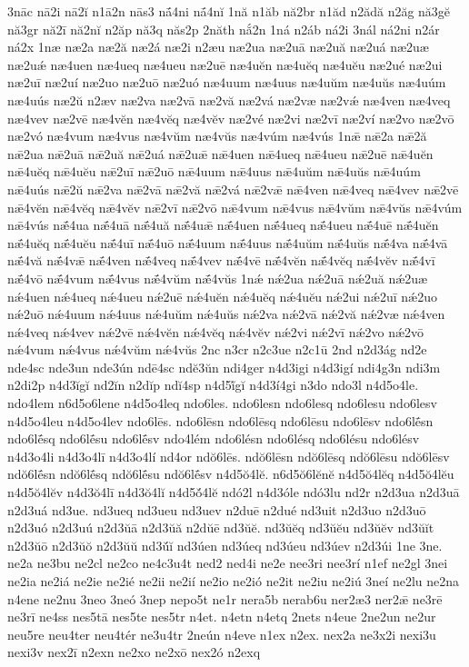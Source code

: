 {3nāc
nā2i
nā2ĭ
n1ā2n
nās3
nā́4ni
nā́4nĭ
1nă
n1ăb
nă2br
n1ăd
n2ădă
n2ăg
nă3gĕ
nă3gr
nă2ī
nă2nĭ
n2ăp
nă3q
năs2p
2năth
nắ2n
1ná
n2áb
ná2i
3nál
ná2ni
n2ár
ná2x
1næ
næ2a
næ2ă
næ2á
næ2i
n2æu
næ2ua
næ2uā
næ2uă
næ2uá
næ2uæ
næ2uǽ
næ4uen
næ4ueq
næ4ueu
næ2uē
næ4uĕn
næ4uĕq
næ4uĕu
næ2ué
næ2ui
næ2uī
næ2uí
næ2uo
næ2uō
næ2uó
næ4uum
næ4uus
næ4uŭm
næ4uŭs
næ4uúm
næ4uús
næ2ŭ
n2æv
næ2va
næ2vā
næ2vă
næ2vá
næ2væ
næ2vǽ
næ4ven
næ4veq
næ4vev
næ2vē
næ4vĕn
næ4vĕq
næ4vĕv
næ2vé
næ2vi
næ2vī
næ2ví
næ2vo
næ2vō
næ2vó
næ4vum
næ4vus
næ4vŭm
næ4vŭs
næ4vúm
næ4vús
1nǣ
nǣ2a
nǣ2ă
nǣ2ua
nǣ2uā
nǣ2uă
nǣ2uá
nǣ2uǣ
nǣ4uen
nǣ4ueq
nǣ4ueu
nǣ2uē
nǣ4uĕn
nǣ4uĕq
nǣ4uĕu
nǣ2uī
nǣ2uō
nǣ4uum
nǣ4uus
nǣ4uŭm
nǣ4uŭs
nǣ4uúm
nǣ4uús
nǣ2ŭ
nǣ2va
nǣ2vā
nǣ2vă
nǣ2vá
nǣ2vǣ
nǣ4ven
nǣ4veq
nǣ4vev
nǣ2vē
nǣ4vĕn
nǣ4vĕq
nǣ4vĕv
nǣ2vī
nǣ2vō
nǣ4vum
nǣ4vus
nǣ4vŭm
nǣ4vŭs
nǣ4vúm
nǣ4vús
nǣ́4ua
nǣ́4uā
nǣ́4uă
nǣ́4uǣ
nǣ́4uen
nǣ́4ueq
nǣ́4ueu
nǣ́4uē
nǣ́4uĕn
nǣ́4uĕq
nǣ́4uĕu
nǣ́4uī
nǣ́4uō
nǣ́4uum
nǣ́4uus
nǣ́4uŭm
nǣ́4uŭs
nǣ́4va
nǣ́4vā
nǣ́4vă
nǣ́4vǣ
nǣ́4ven
nǣ́4veq
nǣ́4vev
nǣ́4vē
nǣ́4vĕn
nǣ́4vĕq
nǣ́4vĕv
nǣ́4vī
nǣ́4vō
nǣ́4vum
nǣ́4vus
nǣ́4vŭm
nǣ́4vŭs
1nǽ
nǽ2ua
nǽ2uā
nǽ2uă
nǽ2uæ
nǽ4uen
nǽ4ueq
nǽ4ueu
nǽ2uē
nǽ4uĕn
nǽ4uĕq
nǽ4uĕu
nǽ2ui
nǽ2uī
nǽ2uo
nǽ2uō
nǽ4uum
nǽ4uus
nǽ4uŭm
nǽ4uŭs
nǽ2va
nǽ2vā
nǽ2vă
nǽ2væ
nǽ4ven
nǽ4veq
nǽ4vev
nǽ2vē
nǽ4vĕn
nǽ4vĕq
nǽ4vĕv
nǽ2vi
nǽ2vī
nǽ2vo
nǽ2vō
nǽ4vum
nǽ4vus
nǽ4vŭm
nǽ4vŭs
2nc
n3cr
n2c3ue
n2c1ū
2nd
n2d3ág
nd2e
nde4sc
nde3un
nde3ún
ndē4sc
ndĕ3ŭn
ndi4ger
n4d3igi
n4d3igí
ndi4g3n
ndi3m
n2di2p
n4d3ĭgĭ
nd2ĭn
n2dĭp
ndĭ4sp
n4d5ĭ́gĭ
n4d3í4gi
n3do
ndo3l
n4d5o4le.
ndo4lem
n6d5o6lene
n4d5o4leq
ndo6les.
ndo6lesn
ndo6lesq
ndo6lesu
ndo6lesv
n4d5o4leu
n4d5o4lev
ndo6lēs.
ndo6lēsn
ndo6lēsq
ndo6lēsu
ndo6lēsv
ndo6lḗsn
ndo6lḗsq
ndo6lḗsu
ndo6lḗsv
ndo4lém
ndo6lésn
ndo6lésq
ndo6lésu
ndo6lésv
n4d3o4li
n4d3o4lī
n4d3o4lí
nd4or
ndŏ6lēs.
ndŏ6lēsn
ndŏ6lēsq
ndŏ6lēsu
ndŏ6lēsv
ndŏ6lḗsn
ndŏ6lḗsq
ndŏ6lḗsu
ndŏ6lḗsv
n4d5ŏ4lĕ.
n6d5ŏ6lĕnĕ
n4d5ŏ4lĕq
n4d5ŏ4lĕu
n4d5ŏ4lĕv
n4d3ŏ4lī
n4d3ŏ4lĭ
n4d5ŏ́4lĕ
ndó2l
n4d3óle
ndó3lu
nd2r
n2d3ua
n2d3uā
n2d3uá
nd3ue.
nd3ueq
nd3ueu
nd3uev
n2duē
n2dué
nd3uit
n2d3uo
n2d3uō
n2d3uó
n2d3uú
n2d3ŭā
n2d3ŭă
n2dŭē
nd3ŭĕ.
nd3ŭĕq
nd3ŭĕu
nd3ŭĕv
nd3ŭĭt
n2d3ŭō
n2d3ŭŏ
n2d3ŭŭ
nd3ŭ́ĭ
nd3úen
nd3úeq
nd3úeu
nd3úev
n2d3úi
1ne
3ne.
ne2a
ne3bu
ne2cl
ne2co
ne4c3u4t
ned2
ned4i
ne2e
nee3ri
nee3rí
n1ef
ne2gl
3nei
ne2ia
ne2iá
ne2ie
ne2ié
ne2ii
ne2ií
ne2io
ne2ió
ne2it
ne2iu
ne2iú
3neí
ne2lu
ne2na
n4ene
ne2nu
3neo
3neó
3nep
nepo5t
ne1r
nera5b
nerab6u
ner2æ3
ner2ǣ
ne3rē
ne3rī
ne4ss
nes5tā
nes5te
nes5tr
n4et.
n4etn
n4etq
2nets
n4eue
2ne2un
ne2ur
neu5re
neu4ter
neu4tér
ne3u4tr
2neún
n4eve
n1ex
n2ex.
nex2a
ne3x2i
nexi3u
nexi3v
nex2ī
n2exn
ne2xo
ne2xō
nex2ó
n2exq
}
